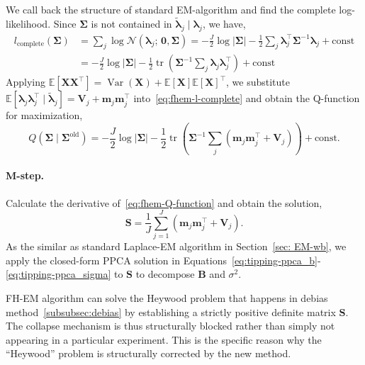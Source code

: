 We call back the structure of standard EM-algorithm and find the complete log-likelihood. Since $\bm{\Sigma}$ is not contained in $\tilde{\bm{\lambda}}_{j}\mid \bm{\lambda}_{j}$, we have,
\begin{align}
    l_{\text{complete}}\left(\bm{\Sigma}\right)&=\sum_{j}\log \mathcal{N}\left(\bm{\lambda}_{j};\,\bm{0},\bm{\Sigma}\right)=-\frac{J}{2}\log|\bm{\Sigma}| - \frac{1}{2}\sum_{j}\bm{\lambda}_j^{\top}\bm{\Sigma}^{-1}\bm{\lambda}_j + \text{const}\\
    &= -\frac{J}{2}\log|\bm{\Sigma}| - \frac{1}{2}\operatorname{tr}\left(\bm{\Sigma}^{-1}\sum_{j}\bm{\lambda}_j\bm{\lambda}_j^{\top}\right) + \text{const}
    \label{eq:fhem-l-complete}
\end{align}
Applying $\mathbb{E}\left[\mathbf{X}\mathbf{X}^{\top}\right]=\operatorname{Var}\left(\mathbf{X}\right)+\mathbb{E}\left[\mathbf{X}\right]\mathbb{E}\left[\mathbf{X}\right]^{\top}$, we substitute $\mathbb{E}\left[\bm{\lambda}_{j}\bm{\lambda}_{j}^{\top}\mid \tilde{\bm{\lambda}}_{j}\right]=\mathbf{V}_{j}+\mathbf{m}_{j}\mathbf{m}_{j}^{\top}$ into~\eqref{eq:fhem-l-complete} and obtain the Q-function for maximization,
\begin{equation}
    Q(\bm{\Sigma} \mid \bm{\Sigma}^{\text{old}}) = -\frac{J}{2}\log|\bm{\Sigma}| - \frac{1}{2}\operatorname{tr}\left(\bm{\Sigma}^{-1}\sum_{j}\left(\mathbf{m}_j\mathbf{m}_j^{\top} + \mathbf{V}_j\right)\right) + \text{const}.
    \label{eq:fhem-Q-function}
\end{equation}

\paragraph*{M-step.}
\label{para:fhem-mstep}
Calculate the derivative of~\eqref{eq:fhem-Q-function} and obtain the solution,
\begin{equation} \mathbf{S} = \frac{1}{J} \sum_{j=1}^{J} \left( \mathbf{m}_j \mathbf{m}_j^{\top} + \mathbf{V}_j \right). 
\label{eq:fhem_mstep} 
\end{equation}
As the similar as standard Laplace-EM algorithm in Section~\ref{sec: EM-wb}, we apply the closed-form PPCA solution in Equations~\eqref{eq:tipping-ppca_b}-\eqref{eq:tipping-ppca_sigma} to $\mathbf{S}$ to decompose $\mathbf{B}$ and $\sigma^{2}$.

FH-EM algorithm can solve the Heywood problem that happens in debias method~\ref{subsubsec:debias} by establishing a strictly positive definite matrix $\mathbf{S}$. The collapse mechanism is thus structurally blocked rather than simply not appearing in a particular experiment. This is the specific reason why the ``Heywood'' problem is structurally corrected by the new method.

